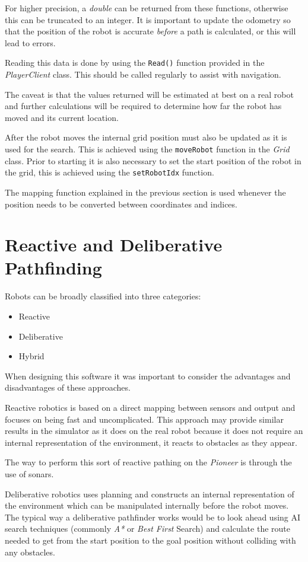 \documentclass[a4paper,12pt]{article}
\begin{document}
For higher precision, a \textit{double} can be returned from these functions, otherwise this can be truncated to an integer. It is important to update the odometry so that the position of the robot is accurate \textit{before} a path is calculated, or this will lead to errors. 

Reading this data is done by using the \texttt{Read()} function provided in the \textit{PlayerClient} class. This should be called regularly to assist with navigation.

The caveat is that the values returned will be estimated at best on a real robot and further calculations will be required to determine how far the robot has moved and its current location.

After the robot moves the internal grid position must also be updated as it is used for the search. This is achieved using the \texttt{moveRobot} function in the \textit{Grid} class. Prior to starting it is also necessary to set the start position of the robot in the grid, this is achieved using the \texttt{setRobotIdx} function. 

The mapping function explained in the previous section is used whenever the position needs to be converted between coordinates and indices.
\section{Reactive and Deliberative Pathfinding}
Robots can be broadly classified into three categories:

\begin{itemize}
    \item{Reactive}
    \item{Deliberative}
    \item{Hybrid}
\end{itemize}
When designing this software it was important to consider the advantages and disadvantages of these approaches. 

Reactive robotics is based on a direct mapping between sensors and output and focuses on being fast and uncomplicated. This approach may provide similar results in the simulator as it does on the real robot because it does not require an internal representation of the environment, it reacts to obstacles as they appear.

The way to perform this sort of reactive pathing on the \textit{Pioneer} is through the use of sonars.

Deliberative robotics uses planning and constructs an internal representation of the environment which can be manipulated internally before the robot moves. The typical way a deliberative pathfinder works would be to look ahead using AI search techniques (commonly \textit{A*} or \textit{Best First} Search) and calculate the route needed to get from the start position to the goal position without colliding with any obstacles.
\end{document}
